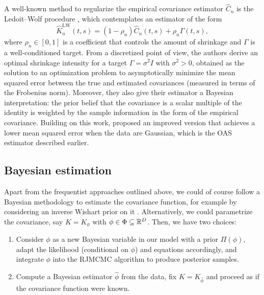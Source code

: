 A well-known method to regularize the empirical covariance estimator \(\hat C_n\) is the Ledoit--Wolf procedure \citep{ledoit2004well}, which contemplates an estimator of the form
\[
\hat K_n^{\text{LW}}(t,s) = (1-\rho_n)\hat C_n(t,s) + \rho_n \Gamma(t,s),
\]
where \(\rho_n \in [0,1]\) is a coefficient that controls the amount of shrinkage and \(\Gamma\) is a well-conditioned target. From a discretized point of view, the authors derive an optimal shrinkage intensity for a target \(\Gamma =\sigma^2 I\) with \(\sigma^2>0\), obtained as the solution to an optimization problem to asymptotically minimize the mean squared error between the true and estimated covariances (measured in terms of the Frobenius norm). Moreover, they also give their estimator a Bayesian interpretation: the prior belief that the covariance is a scalar multiple of the identity is weighted by the sample information in the form of the empirical covariance. Building on this work, \citet{chen2010shrinkage} proposed an improved version that achieves a lower mean squared error when the data are Gaussian, which is the \acs{OAS} estimator described earlier.

\subsection*{Bayesian estimation}

Apart from the frequentist approaches outlined above, we could of course follow a Bayesian methodology to estimate the covariance function, for example by considering an inverse Wishart prior on it \citep[e.g.][]{yang2016smoothing}. Alternatively, we could parametrize the covariance, say \(K=K_\phi\) with \(\phi\in\Phi \subseteq \mathbb{R}^D\). Then, we have two choices:
\begin{enumerate}
  \item Consider \(\phi\) as a new Bayesian variable in our model with a prior \(\Pi(\phi)\), adapt the likelihood (conditional on \(\phi\)) and equations accordingly, and integrate \(\phi\) into the \acs{RJMCMC} algorithm to produce posterior samples.
  \item Compute a Bayesian estimator \(\hat\phi\) from the data, fix \(K=K_{\hat\phi}\) and proceed as if the covariance function were known.
\end{enumerate}

